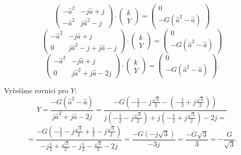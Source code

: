 \documentclass{article}
\begin{document}
$$
    \begin{pmatrix}
        -\hat{a}^2 & - j \hat{a} + j \\
        -\hat{a}^2 & j \hat{a}^2 - j
    \end{pmatrix}
    \cdot
    \begin{pmatrix}
        k \\
        Y
    \end{pmatrix}
    =
    \begin{pmatrix}
        0 \\
        - G (\hat{a}^2 - \hat{a})
    \end{pmatrix}
$$
$$
    \begin{pmatrix}
        -\hat{a}^2 & - j \hat{a} + j                 \\
        0          & j \hat{a}^2 - j + j \hat{a} - j
    \end{pmatrix}
    \cdot
    \begin{pmatrix}
        k \\
        Y
    \end{pmatrix}
    =
    \begin{pmatrix}
        0 \\
        - G (\hat{a}^2 - \hat{a})
    \end{pmatrix}
$$
$$
    \begin{pmatrix}
        -\hat{a}^2 & - j \hat{a} + j               \\
        0          & j \hat{a}^2 + j \hat{a} - 2 j
    \end{pmatrix}
    \cdot
    \begin{pmatrix}
        k \\
        Y
    \end{pmatrix}
    =
    \begin{pmatrix}
        0 \\
        - G (\hat{a}^2 - \hat{a})
    \end{pmatrix}.
$$

Vyřešíme rovnici pro $Y$:
$$
    Y = \frac{- G (\hat{a}^2 - \hat{a})}{j \hat{a}^2 + j \hat{a} - 2 j} = \frac{
        - G \left( -\frac{1}{2} - j \frac{\sqrt{3}}{2} - \left( -\frac{1}{2} + j \frac{\sqrt{3}}{2} \right) \right)
    }{
        j \left( -\frac{1}{2} - j \frac{\sqrt{3}}{2} \right) + j \left( -\frac{1}{2} + j \frac{\sqrt{3}}{2} \right) - 2 j =
    }
$$
$$
    = \frac{
        - G \left( -\frac{1}{2} - j \frac{\sqrt{3}}{2} + \frac{1}{2} - j \frac{\sqrt{3}}{2} \right)
    }{
        -j \frac{1}{2} + \frac{\sqrt{3}}{2} - j \frac{1}{2} - \frac{\sqrt{3}}{2} - 2 j
    } = \frac{
        - G \left( -j \sqrt{3} \right)
    }{
        -3 j
    } = \frac{- G \sqrt{3}}{3} = -\frac{G}{\sqrt{3}}.
$$
\end{document}
